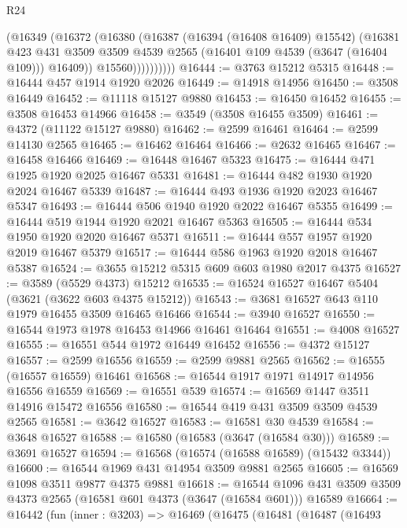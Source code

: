 \begin{lexlean}{R24}
\begin{coremodule}
                  (@16349
                    (@16372
                      (@16380
                        (@16387
                          (@16394 (@16408 @16409) @15542)
                          (@16381
                            @423
                            @431
                            @3509
                            @3509
                            @4539
                            @2565
                            (@16401 @109 @4539 (@3647 (@16404 @109)))
                            @16409))
                        @15560))))))))))
@16444 := @3763 @15212 @5315
@16448 := @16444 @457 @1914 @1920 @2026
@16449 := @14918 @14956
@16450 := @3508 @16449
@16452 := @11118 @15127 @9880
@16453 := @16450 @16452
@16455 := @3508 @16453 @14966
@16458 := @3549 (@3508 @16455 @3509)
@16461 := @4372 (@11122 @15127 @9880)
@16462 := @2599 @16461
@16464 := @2599 @14130 @2565
@16465 := @16462 @16464
@16466 := @2632 @16465
@16467 := @16458 @16466
@16469 := @16448 @16467 @5323
@16475 := @16444 @471 @1925 @1920 @2025 @16467 @5331
@16481 := @16444 @482 @1930 @1920 @2024 @16467 @5339
@16487 := @16444 @493 @1936 @1920 @2023 @16467 @5347
@16493 := @16444 @506 @1940 @1920 @2022 @16467 @5355
@16499 := @16444 @519 @1944 @1920 @2021 @16467 @5363
@16505 := @16444 @534 @1950 @1920 @2020 @16467 @5371
@16511 := @16444 @557 @1957 @1920 @2019 @16467 @5379
@16517 := @16444 @586 @1963 @1920 @2018 @16467 @5387
@16524 := @3655 @15212 @5315 @609 @603 @1980 @2017 @4375
@16527 := @3589 (@5529 @4373) @15212
@16535 := @16524 @16527 @16467 @5404 (@3621 (@3622 @603 @4375 @15212))
@16543 := @3681 @16527 @643 @110 @1979 @16455 @3509 @16465 @16466
@16544 := @3940 @16527
@16550 := @16544 @1973 @1978 @16453 @14966 @16461 @16464
@16551 := @4008 @16527
@16555 := @16551 @544 @1972 @16449 @16452
@16556 := @4372 @15127
@16557 := @2599 @16556
@16559 := @2599 @9881 @2565
@16562 := @16555 (@16557 @16559) @16461
@16568 := @16544 @1917 @1971 @14917 @14956 @16556 @16559
@16569 := @16551 @539
@16574 := @16569 @1447 @3511 @14916 @15472 @16556
@16580 := @16544 @419 @431 @3509 @3509 @4539 @2565
@16581 := @3642 @16527
@16583 := @16581 @30 @4539
@16584 := @3648 @16527
@16588 := @16580 (@16583 (@3647 (@16584 @30)))
@16589 := @3691 @16527
@16594 := @16568 (@16574 (@16588 @16589) (@15432 @3344))
@16600 := @16544 @1969 @431 @14954 @3509 @9881 @2565
@16605 := @16569 @1098 @3511 @9877 @4375 @9881
@16618 := @16544 @1096 @431 @3509 @3509 @4373 @2565 (@16581 @601 @4373 (@3647 (@16584 @601))) @16589
@16664 := @16442
    (fun (inner : @3203) =>
    @16469
      (@16475
        (@16481
          (@16487
            (@16493

\end{coremodule}
\end{lexlean}
